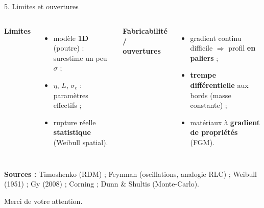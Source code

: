 \documentclass[11pt,aspectratio=169]{beamer}
\begin{document}
\begin{frame}{5. Limites et ouvertures}
  \begin{columns}[T]
    \footnotesize\textbf{Limites}
    \begin{itemize}\scriptsize
      \item modèle \textbf{1D} (poutre) : surestime un peu $\sigma$ ;
      \item $\eta$, $L$, $\sigma_c$ : paramètres effectifs ;
      \item rupture réelle \textbf{statistique} (Weibull spatial).
    \end{itemize}
    \footnotesize\textbf{Fabricabilité / ouvertures}
    \begin{itemize}\scriptsize
      \item gradient continu difficile $\Rightarrow$ profil \textbf{en paliers} ;
      \item \textbf{trempe différentielle} aux bords (masse constante) ;
      \item matériaux à \textbf{gradient de propriétés} (FGM).
    \end{itemize}
  \end{columns}
  \vspace{0.5cm}
  \centering\footnotesize \textbf{Sources :} Timoshenko (RDM) ; Feynman
  (oscillations, analogie RLC) ; Weibull (1951) ; Gy (2008) ; Corning ;
  Dunn \& Shultis (Monte-Carlo).
  \vspace{0.3cm}
  \par\centering\Large\textcolor{verre}{Merci de votre attention.}
\end{frame}
\end{document}
